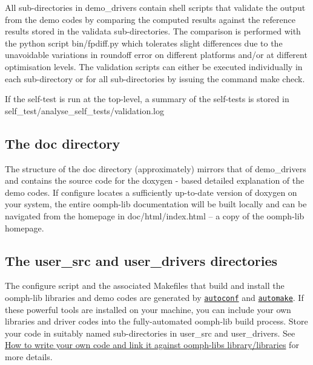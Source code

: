 All sub-\/directories in {\ttfamily demo\+\_\+drivers} contain shell scripts that validate the output from the demo codes by comparing the computed results against the reference results stored in the {\ttfamily validata} sub-\/directories. The comparison is performed with the {\ttfamily python} script {\ttfamily bin/fpdiff}.{\ttfamily py} which tolerates slight differences due to the unavoidable variations in roundoff error on different platforms and/or at different optimisation levels. The validation scripts can either be executed individually in each sub-\/directory or for all sub-\/directories by issuing the command {\ttfamily make} {\ttfamily check}.

If the self-\/test is run at the top-\/level, a summary of the self-\/tests is stored in {\ttfamily self\+\_\+test/analyse\+\_\+self\+\_\+tests/validation}.{\ttfamily log} \hypertarget{index_doc}{}\subsection{The doc directory}\label{index_doc}
The structure of the {\ttfamily doc} directory (approximately) mirrors that of {\ttfamily demo\+\_\+drivers} and contains the source code for the {\ttfamily doxygen} -\/ based detailed explanation of the demo codes. If {\ttfamily configure} locates a sufficiently up-\/to-\/date version of {\ttfamily doxygen} on your system, the entire {\ttfamily oomph-\/lib} documentation will be built locally and can be navigated from the homepage in {\ttfamily doc/html/index}.{\ttfamily html} -- a copy of the {\ttfamily oomph-\/lib} homepage.\hypertarget{index_user}{}\subsection{The user\+\_\+src and user\+\_\+drivers directories}\label{index_user}
The {\ttfamily configure} script and the associated {\ttfamily Makefiles} that build and install the {\ttfamily oomph-\/lib} libraries and demo codes are generated by \href{http://www.gnu.org/software/autoconf/}{\tt autoconf} and \href{http://www.gnu.org/software/automake/}{\tt automake}. If these powerful tools are installed on your machine, you can include your own libraries and driver codes into the fully-\/automated {\ttfamily oomph-\/lib} build process. Store your code in suitably named sub-\/directories in {\ttfamily user\+\_\+src} and {\ttfamily user\+\_\+drivers}. See \hyperlink{index_own}{How to write your own code and link it against oomph-\/lib\textquotesingle{}s library/libraries} for more details.



